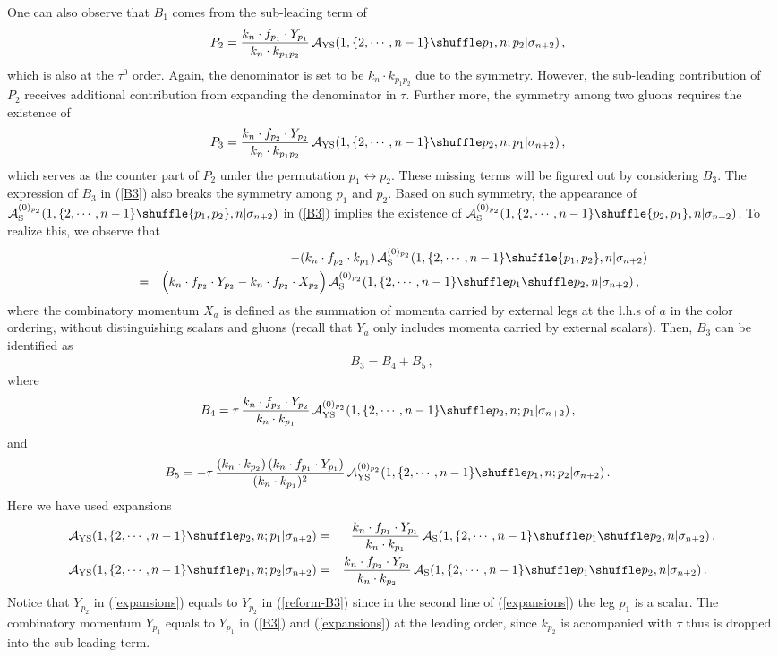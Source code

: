 \documentclass[preprint,showpacs,onecolumn,nofootinbib]{revtex4}
\newcommand{\bea}{\begin{eqnarray}}
\newcommand{\eea}{\end{eqnarray}}
\newcommand{\nn}{\nonumber \\}
\def\eref#1{(\ref{#1})}
\begin{document}
One can also observe that $B_1$ comes from the sub-leading term of
%
\bea
P_2={k_n\cdot f_{p_1}\cdot Y_{p_1}\over k_n\cdot k_{p_1p_2}}\,{\cal A}_{\rm YS}(1,\{2,\cdots,n-1\}\shuffle p_1,n;p_2|\sigma_{n+2})\,,~~\label{2g-P2}
\eea
%
which is also at the $\tau^0$ order. Again, the denominator is set to be $k_n\cdot k_{p_1p_2}$ due to the symmetry. However, the sub-leading contribution of $P_2$ receives additional contribution from expanding the denominator in $\tau$. Further more, the symmetry among two gluons requires the existence of
%
\bea
P_3={k_n\cdot f_{p_2}\cdot Y_{p_2}\over k_n\cdot k_{p_1p_2}}\,{\cal A}_{\rm YS}(1,\{2,\cdots,n-1\}\shuffle p_2,n;p_1|\sigma_{n+2})\,,~~\label{2g-P3}
\eea
%
which serves as the counter part of $P_2$ under the permutation $p_1\leftrightarrow p_2$.
These missing terms will be figured out by considering $B_3$. The expression of $B_3$ in \eref{B3} also breaks the symmetry among $p_1$ and $p_2$.
Based on such symmetry, the appearance of ${\cal A}^{(0)_{p_2}}_{\rm S}(1,\{2,\cdots,n-1\}\shuffle \{p_1,p_2\},n|\sigma_{n+2})$ in \eref{B3} implies the existence of ${\cal A}^{(0)_{p_2}}_{\rm S}(1,\{2,\cdots,n-1\}\shuffle \{p_2,p_1\},n|\sigma_{n+2})$. To realize this, we observe that
%
\bea
& &-(k_n\cdot f_{p_2}\cdot k_{p_1})\,{\cal A}^{(0)_{p_2}}_{\rm S}(1,\{2,\cdots,n-1\}\shuffle\{p_1,p_2\},n|\sigma_{n+2})\nn
&=&\Big(k_n\cdot f_{p_2}\cdot Y_{p_2}-k_n\cdot f_{p_2}\cdot X_{p_2} \Big)\,{\cal A}^{(0)_{p_2}}_{\rm S}(1,\{2,\cdots,n-1\}\shuffle p_1\shuffle p_2,n|\sigma_{n+2})\,,~~\label{reform-B3}
\eea
%
where the combinatory momentum $X_a$ is defined as the summation of momenta carried by external legs at the l.h.s of $a$ in the color ordering, without distinguishing scalars and gluons (recall that $Y_a$ only includes momenta carried by external scalars).
Then, $B_3$ can be identified as
%
\bea
B_3=B_4+B_5\,,
\eea
%
where
%
\bea
B_4=\tau\,{k_n\cdot f_{p_2}\cdot Y_{p_2}\over k_n\cdot k_{p_1}}\,{\cal A}^{(0)_{p_2}}_{\rm YS}(1,\{2,\cdots,n-1\}\shuffle p_2,n;p_1|\sigma_{n+2})\,,~~\label{B4}
\eea
%
and
%
\bea
B_5=-\tau\,{(k_n\cdot k_{p_2})\,(k_n\cdot f_{p_1}\cdot Y_{p_1})\over (k_n\cdot k_{p_1})^2}\,{\cal A}^{(0)_{p_2}}_{\rm YS}(1,\{2,\cdots,n-1\}\shuffle p_1,n;p_2|\sigma_{n+2})\,.~~\label{B5}
\eea
%
Here we have used expansions
%
\bea
{\cal A}_{\rm YS}(1,\{2,\cdots,n-1\}\shuffle p_2,n;p_1|\sigma_{n+2})&=&{k_n\cdot f_{p_1}\cdot Y_{p_1}\over k_n\cdot k_{p_1}}\,{\cal A}_{\rm S}(1,\{2,\cdots,n-1\}\shuffle p_1\shuffle p_2,n|\sigma_{n+2})\,,\nn
{\cal A}_{\rm YS}(1,\{2,\cdots,n-1\}\shuffle p_1,n;p_2|\sigma_{n+2})&=&{k_n\cdot f_{p_2}\cdot Y_{p_2}\over k_n\cdot k_{p_2}}\,{\cal A}_{\rm S}(1,\{2,\cdots,n-1\}\shuffle p_1\shuffle p_2,n|\sigma_{n+2})\,.~~\label{expansions}
\eea
%
Notice that $Y_{p_2}$ in \eref{expansions} equals to $Y_{p_2}$ in \eref{reform-B3} since in the second line of \eref{expansions} the leg $p_1$ is a scalar. The combinatory momentum $Y_{p_1}$ equals to $Y_{p_1}$ in \eref{B3} and \eref{expansions} at the leading order, since $k_{p_2}$ is accompanied with $\tau$ thus is dropped into the sub-leading term.
\end{document}
